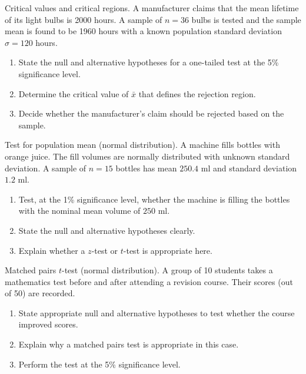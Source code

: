 \documentclass[11pt]{article}
\def\textbf#1{#1}%
\newcounter{question}
\begin{document}

\begin{question}
\textbf{Critical values and critical regions.}
A manufacturer claims that the mean lifetime of its light bulbs is 2000 hours. A sample of $n=36$ bulbs is tested and the sample mean is found to be 1960 hours with a known population standard deviation $\sigma=120$ hours.
\begin{enumerate}
    \item State the null and alternative hypotheses for a one-tailed test at the 5\% significance level.
    \item Determine the critical value of $\bar{x}$ that defines the rejection region.
    \item Decide whether the manufacturer's claim should be rejected based on the sample.
\end{enumerate}
\end{question}

\begin{question}
\textbf{Test for population mean (normal distribution).}
A machine fills bottles with orange juice. The fill volumes are normally distributed with unknown standard deviation. A sample of $n=15$ bottles has mean $250.4$ ml and standard deviation $1.2$ ml.
\begin{enumerate}
    \item Test, at the 1\% significance level, whether the machine is filling the bottles with the nominal mean volume of $250$ ml.
    \item State the null and alternative hypotheses clearly.
    \item Explain whether a $z$-test or $t$-test is appropriate here.
\end{enumerate}
\end{question}

\begin{question}
\textbf{Matched pairs $t$-test (normal distribution).}
A group of 10 students takes a mathematics test before and after attending a revision course. Their scores (out of 50) are recorded. 
\begin{enumerate}
    \item State appropriate null and alternative hypotheses to test whether the course improved scores.
    \item Explain why a matched pairs test is appropriate in this case.
    \item Perform the test at the 5\% significance level.
\end{enumerate}
\end{question}
\end{document}

